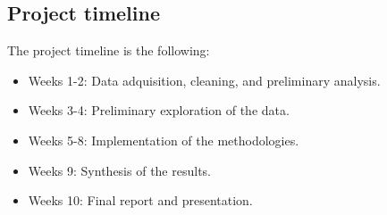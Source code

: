 \documentclass{psu-plan}
\begin{document}
\subsection{Project timeline}

The project timeline is the following:
\begin{itemize}
    \item Weeks 1-2: Data adquisition, cleaning, and preliminary analysis.
    \item Weeks 3-4: Preliminary exploration of the data.
    \item Weeks 5-8: Implementation of the methodologies.
    \item Weeks 9: Synthesis of the results.
    \item Weeks 10: Final report and presentation.
\end{itemize}

\nocite{*} %
\printbibliography[heading=bibintoc,title=Bibliography]
\end{document}
